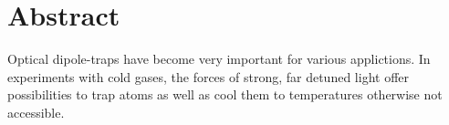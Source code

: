\chapter*{Abstract}

Optical dipole-traps have become very important for various applictions. In experiments with cold gases, the forces of strong, far detuned light offer possibilities to trap atoms as well as cool them to temperatures otherwise not accessible. 
